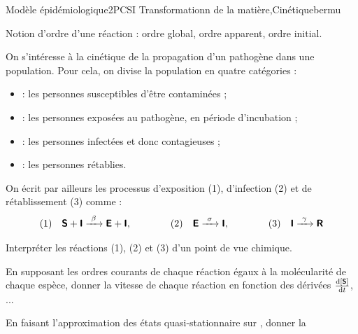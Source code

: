 \begin{exercise}{Modèle épidémiologique}{2}{PCSI}
{Transformationn de la matière,Cinétique}{bermu}

\begin{questions}
\questioncours Notion d'ordre d'une réaction : ordre global, ordre apparent, ordre initial.

\begin{EnvUplevel}
    On s'intéresse à la cinétique de la propagation d'un pathogène dans une population. Pour cela, on divise la population en quatre catégories :
    \begin{itemize}
        \item {} : les personnes susceptibles d'être contaminées ;
        \item {} : les personnes exposées au pathogène, en période d'incubation ;
        \item {} : les personnes infectées et donc contagieuses ;
        \item {} : les personnes rétablies.
    \end{itemize}
    
    On écrit par ailleurs les processus d'exposition (1), d'infection (2) et de rétablissement (3) comme :
    $$\text{(1)}\quad\textbf{\textsf{S}} + \textbf{\textsf{I}} \xrightarrow[]{\ \beta\ } \textbf{\textsf{E}} + \textbf{\textsf{I}}, \qquad\qquad
    \text{(2)}\quad\textbf{\textsf{E}} \xrightarrow[]{\ \sigma\ }
      \textbf{\textsf{I}} , \qquad\qquad
      \text{(3)}\quad\textbf{\textsf{I}}\xrightarrow[]{\ \gamma\ }
      \textbf{\textsf{R}} $$
\end{EnvUplevel}

\question Interpréter les réactions (1), (2) et (3) d'un point de vue chimique.

\question En supposant les ordres courants de chaque réaction égaux à la molécularité de chaque espèce, donner la vitesse de chaque réaction en fonction des dérivées $\dv{[\textbf{\textsf{S}}]}{t}$, ...

\question En faisant l'approximation des états quasi-stationnaire sur , donner la 


\end{questions}


\end{exercise}



